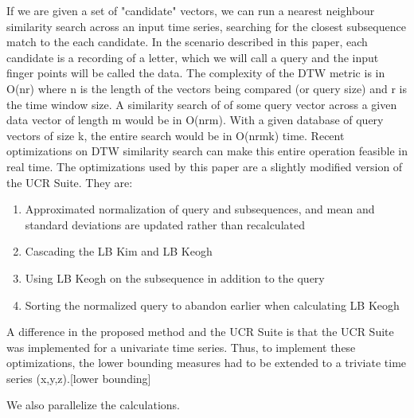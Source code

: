 If we are given a set of "candidate" vectors, we can run a nearest neighbour similarity search across an input time series, searching for the closest subsequence match to the each candidate. In the scenario described in this paper, each candidate is a recording of a letter, which we will call a query and the input finger points will be called the data.
The complexity of the DTW metric is in O(nr) where n is the length of the vectors being compared (or query size) and r is the time window size. A similarity search of of some query vector across a given data vector of length m would be in O(nrm). With a given database of query vectors of size k, the entire search would be in O(nrmk) time.
Recent optimizations on DTW similarity search can make this entire operation feasible in real time. The optimizations used by this paper are a slightly modified version of the UCR Suite. They are: 
\begin{enumerate}
\item
Approximated normalization of query and subsequences, and mean and standard deviations are updated rather than recalculated
\item
Cascading the LB Kim and LB Keogh
\item
Using LB Keogh on the subsequence in addition to the query
\item
Sorting the normalized query to abandon earlier when calculating LB Keogh
\end{enumerate}
A difference in the proposed method and the UCR Suite is that the UCR Suite was implemented for a univariate time series. Thus, to implement these optimizations, the lower bounding measures had to be extended to a triviate time series (x,y,z).[lower bounding]

We also parallelize the calculations.
